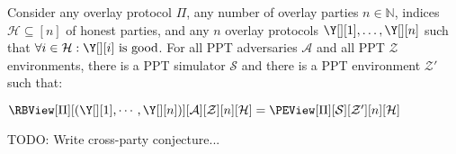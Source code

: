 \begin{conjecture}[Simulation]
  Consider any overlay protocol $\Pi$, any number of overlay parties $n \in \mathbb{N}$,
  indices $\mathcal{H} \subseteq [n]$ of honest parties,
  and any $n$ overlay protocols $\Y[][1], \ldots, \Y[][n]$
  such that $\forall i \in \mathcal{H}: \Y[][i] \text{ is good}$.
  For all PPT adversaries $\mathcal{A}$ and all PPT $\mathcal{Z}$ environments,
  there is a PPT simulator $\mathcal{S}$ and there is a PPT environment $\mathcal{Z}'$ such that:

  $\RBView[\Pi][({\Y[][1]}, \cdots, {\Y[][n]})][\mathcal{A}][\mathcal{Z}][n][\mathcal{H}]
   =
   \PEView[\Pi][\mathcal{S}][\mathcal{Z}'][n][\mathcal{H}]$
\end{conjecture}

\begin{conjecture}
  TODO: Write cross-party conjecture...
\end{conjecture}

